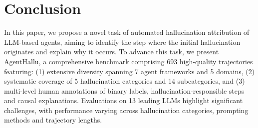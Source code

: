 \section{Conclusion}
\label{sec:conclu}
In this paper, we propose a novel task of automated hallucination attribution of LLM-based agents, aiming to identify the step where the initial hallucination originates and explain why it occurs.
To advance this task, we present AgentHallu, a comprehensive benchmark comprising 693 high-quality trajectories featuring: (1) extensive diversity spanning 7 agent frameworks and 5 domains, (2) systematic coverage of 5 hallucination categories and 14 subcategories, and (3) multi-level human annotations of binary labels, hallucination-responsible steps and causal explanations.
Evaluations on 13 leading LLMs highlight significant challenges, with performance varying across hallucination categories, prompting methods and trajectory lengths. 



